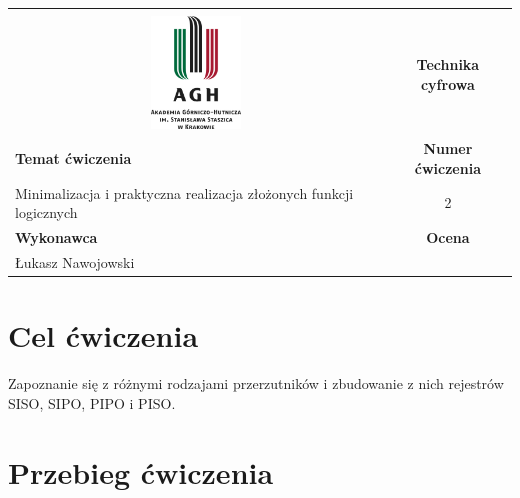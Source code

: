 \documentclass[12pt,a4paper]{article}
\begin{document}
\begin{table}[H]
\label{my-label}
\begin{tabular}[width=\textwidth, height=0.5]{|c|c|}
\hline
									           					&                           \\
\includegraphics[height=3cm]{img/logo}             					& \textbf{Technika cyfrowa} \\ \hline
\multicolumn{1}{|l|}{\textbf{Temat ćwiczenia}} 					& \textbf{Numer ćwiczenia}  \\
\multicolumn{1}{|l|}{Minimalizacja i praktyczna realizacja złożonych funkcji logicznych}	& 2                         \\ \hline
\multicolumn{1}{|l|}{\textbf{Wykonawca}}       & \textbf{Ocena}            \\
\multicolumn{1}{|l|}{Łukasz Nawojowski}          &                           \\ \hline
\end{tabular}
\end{table}

\section{Cel ćwiczenia}
Zapoznanie się z różnymi rodzajami przerzutników i zbudowanie z nich rejestrów SISO, SIPO, PIPO i PISO.

\section{Przebieg ćwiczenia}
\end{document}
